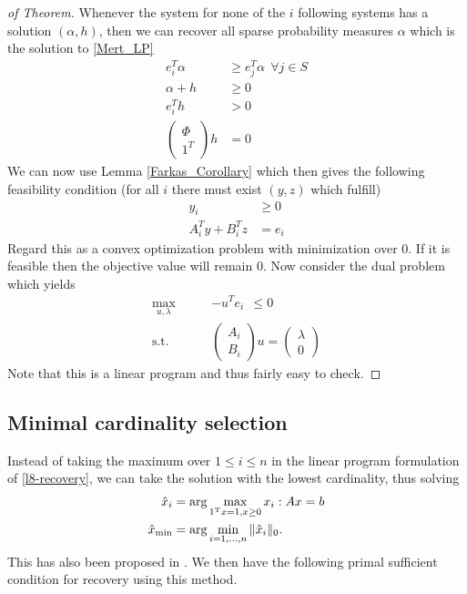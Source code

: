 \documentclass{article} %
\begin{document}
\begin{proof}[of Theorem]
Whenever the system for none of the $i$ following systems has a solution $(\alpha,h)$, then we can recover all sparse probability measures $\alpha$ which is the solution to \eqref{Mert_LP} 
\begin{align*}
e_i^T\alpha &\geq e_j^T \alpha \:\: \forall j \in S\\
\alpha + h &\geq 0\\
e_i^T h &> 0\\
\begin{pmatrix}\Phi\\ 1^T\end{pmatrix} h &= 0
\end{align*}
We can now use Lemma \ref{Farkas_Corollary} which then gives the following feasibility condition (for all $i$ there must exist  $(y,z)$ which fulfill)
\begin{align*}
y_i &\geq 0\\
A_i^Ty + B_i^T z &= e_i
\end{align*}
Regard this as a convex optimization problem with minimization over $0$. If it is feasible then the objective value will remain 0. Now consider the dual problem which yields
\begin{align*}
\max_{u,\lambda} \qquad &- u^T e_i\:\: \leq 0\\
\text{s.t.} \qquad& \begin{pmatrix} A_i\\ B_i \end{pmatrix} u = \begin{pmatrix} \lambda \\ 0\end{pmatrix}
\end{align*}
Note that this is a linear program and thus fairly easy to check. 
\end{proof}

\subsection{Minimal cardinality selection} 
Instead of taking the maximum over $1\leq i\leq n$ in the linear program formulation of \eqref{l8-recovery}, we can take the solution with the lowest cardinality, thus solving
\begin{align}
\hat{x}_i &= \arg\max_{1^{\rm T} x =1, x\geq 0} x_i : Ax  = b \label{min-cardinality}\\
\hat{x}_{\min} &= \arg\min_{i=1, \dots, n} \|\hat{x}_i\|_0. \nonumber
\end{align}
This has also been proposed in \cite{mert}. We then have the following primal sufficient condition for recovery using this method.
\end{document}

